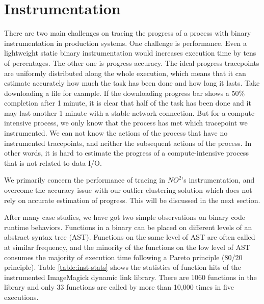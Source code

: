 \section{Instrumentation} \label{sec-instrument}

There are two main challenges on tracing the progress of a process with binary instrumentation
in production systems. One challenge is performance. Even a lightweight static binary
instrumentation would increases execution time by tens of percentages. The other one is
progress accuracy. The ideal progress tracepoints are uniformly distributed along the whole execution, which
means that it can estimate accurately how much the task has been done and how long it
lasts. Take downloading a file for example. If the downloading progress bar shows a
50\% completion after 1 minute, it is clear that half of the task has been done and it may
last another 1 minute with a stable network connection. But for a compute-intensive
process, we only know that the process has met which tracepoint we instrumented. We can
not know the actions of the process that have no instrumented tracepoints, and neither the subsequent actions of the process. In other words, it is hard to estimate the progress of a compute-intensive
process that is not related to data I/O.

We primarily concern the performance of tracing in $NO^2$'s instrumentation, and 
overcome the accuracy issue with our outlier clustering solution which does not rely on
accurate estimation of progress. This will be discussed in the next section.

After many case studies, we have got two simple observations on binary code runtime
behaviors. Functions in a binary can be placed on different levels of an abstract syntax
tree (AST). Functions on the same level of AST are often called at similar frequency, and
the minority of the functions on the low level of AST consumes the majority of execution time
following a Pareto principle (80/20 principle). Table \ref{table:inst-stats} shows
the statistics of function hits of the instrumented ImageMagick dynamic link library.
There are 1060 functions in the library and only 33 functions are called by more than 10,000
times in five executions.

